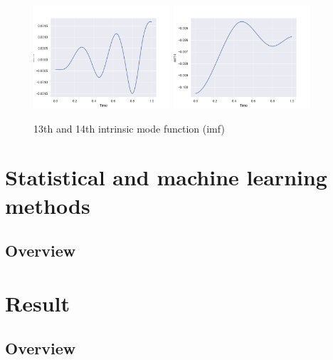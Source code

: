 \documentclass[11pt, oneside]{article}   	%
\begin{document}
\begin{flushleft}
\begin{figure}[H] %
   \centering
   \includegraphics[width=2in]{imf/imf13.png} 
     \includegraphics[width=2in]{imf/imf14.png} 
   \caption{13th and 14th intrinsic mode function (imf)}
   \label{fig:imf1314}
\end{figure}

\end{flushleft}


\section{Statistical and machine learning methods}
\subsection{Overview}




\section{Result}
\subsection{Overview}
\end{document}
